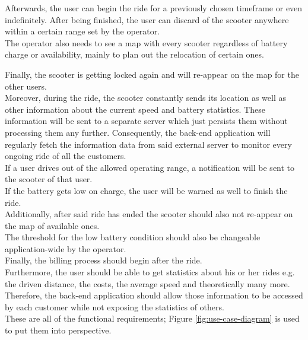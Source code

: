 \documentclass[12pt,a4paper]{report}
\begin{document}
Afterwards, the user can begin the ride for a previously chosen timeframe
or even indefinitely. After being finished, the user can discard of the scooter
anywhere within a certain range set by the operator.\\

The operator also needs to see a map with every scooter regardless of battery
charge or availability, mainly to plan out the relocation of certain ones.

Finally, the scooter is getting locked again and will re-appear on the map for the other users.\\

Moreover, during the ride, the scooter constantly sends its location as well
as other information about the current speed and battery statistics.
These information will be sent to a separate server which just persists them
without processing them any further.
Consequently, the back-end application will regularly fetch the information data
from said external server to monitor every ongoing ride of all the customers.\\

If a user drives out of the allowed operating range, a notification will be sent
to the scooter of that user.\\

If the battery gets low on charge, the user will be warned as well to finish the ride.\\

Additionally, after said ride has ended the scooter should also not re-appear
on the map of available ones.\\

The threshold for the low battery condition should also be changeable
application-wide by the operator.\\

Finally, the billing process should begin after the ride.\\

Furthermore, the user should be able to get statistics about his or her rides
e.g. the driven distance, the costs, the average speed and theoretically
many more. Therefore, the back-end application should allow those information
to be accessed by each customer while not exposing the statistics of others.\\

These are all of the functional requirements;
Figure \ref{fig:use-case-diagram} is used to put them into perspective.\\
\end{document}
